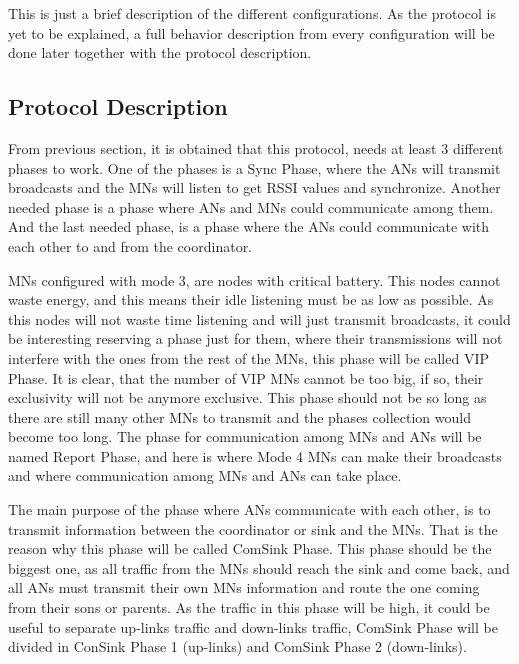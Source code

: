 This is just a brief description of the different configurations. As the protocol is yet to be explained, a full behavior description from 
every configuration will be done later together with the protocol description.

\subsection{Protocol Description}

From previous section, it is obtained that this protocol, needs at least 3 different phases to work. One of the phases is a Sync 
Phase, where the \acp{AN} will transmit broadcasts and the \acp{MN} will listen to get \ac{RSSI} values and synchronize. Another needed 
phase is a phase where \acp{AN} and \acp{MN} could communicate among them. And the last needed phase, is a phase where the \acp{AN} could 
communicate with each other to and from the coordinator.

\acp{MN} configured with mode 3, are nodes with critical battery. This nodes cannot waste energy, and this means their idle listening must be
as low as possible. As this nodes will not waste time listening and will just transmit broadcasts, it could be interesting reserving a phase
just for them, where their transmissions will not interfere with the ones from the rest of the \acp{MN}, this phase will be called \ac{VIP} 
Phase. It is clear, that the number of \ac{VIP} \acp{MN} cannot be too big, if so, their exclusivity will not be anymore exclusive.
This phase should not be so long as there are still many other \acp{MN} to transmit and the phases collection would become too long.
The phase for communication among \acp{MN} and \acp{AN} will be named Report Phase, and here is where Mode 4 \acp{MN} can make 
their broadcasts and where communication among \acp{MN} and \acp{AN} can take place.

The main purpose of the phase where \acp{AN} communicate with each other, is to transmit information between the coordinator or sink and 
the \acp{MN}. That is the reason why this phase will be called ComSink Phase. This phase should be the biggest one, as all traffic from 
the \acp{MN} should reach the sink and come back, and all \acp{AN} must transmit their own \acp{MN} information and route the one coming from
their sons or parents. As the traffic in this phase will be high, it could be useful to separate up-links traffic and down-links traffic, 
ComSink Phase will be divided in ConSink Phase 1 (up-links) and ComSink Phase 2 (down-links).

